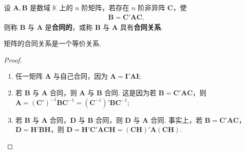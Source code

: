 \documentclass[../../main.tex]{subfiles}%
\begin{document}
\begin{definition}[矩阵的合同关系]\label{definition:矩阵的合同关系}
设 $\boldsymbol{A},\boldsymbol{B}$ 是数域 $\mathbb{K}$ 上的 $n$ 阶矩阵，若存在 $n$ 阶非异阵 $\boldsymbol{C}$，使
\begin{align*}
\boldsymbol{B}=\boldsymbol{C}'\boldsymbol{A}\boldsymbol{C},
\end{align*}
则称 $\boldsymbol{B}$ 与 $\boldsymbol{A}$ 是\textbf{合同的}，或称 $\boldsymbol{B}$ 与 $\boldsymbol{A}$ 具有\textbf{合同关系}.
\end{definition}

\begin{theorem}
矩阵的合同关系是一个等价关系.
\end{theorem}
\begin{proof}
\begin{enumerate}
\item 任一矩阵 $\boldsymbol{A}$ 与自己合同，因为 $\boldsymbol{A}=\boldsymbol{I}'\boldsymbol{A}\boldsymbol{I}$;
\item 若 $\boldsymbol{B}$ 与 $\boldsymbol{A}$ 合同，则 $\boldsymbol{A}$ 与 $\boldsymbol{B}$ 合同. 这是因为若 $\boldsymbol{B}=\boldsymbol{C}'\boldsymbol{A}\boldsymbol{C}$，则 $\boldsymbol{A}=(\boldsymbol{C}')^{-1}\boldsymbol{B}\boldsymbol{C}^{-1}=(\boldsymbol{C}^{-1})'\boldsymbol{B}\boldsymbol{C}^{-1}$;
\item 若 $\boldsymbol{B}$ 与 $\boldsymbol{A}$ 合同，$\boldsymbol{D}$ 与 $\boldsymbol{B}$ 合同，则 $\boldsymbol{D}$ 与 $\boldsymbol{A}$ 合同. 事实上，若 $\boldsymbol{B}=\boldsymbol{C}'\boldsymbol{A}\boldsymbol{C}$，$\boldsymbol{D}=\boldsymbol{H}'\boldsymbol{B}\boldsymbol{H}$，则 $\boldsymbol{D}=\boldsymbol{H}'\boldsymbol{C}'\boldsymbol{A}\boldsymbol{C}\boldsymbol{H}=(\boldsymbol{C}\boldsymbol{H})'\boldsymbol{A}(\boldsymbol{C}\boldsymbol{H})$.
\end{enumerate} 
\end{proof}
\end{document}
